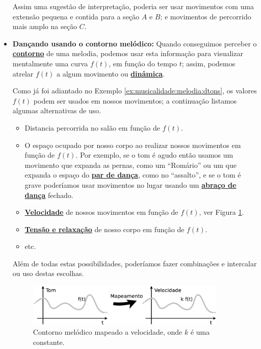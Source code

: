 \begin{itemize}
\begin{example}
Assim uma sugestão de interpretação, 
poderia ser usar movimentos com uma extensão pequena e contida para
a seção $A$ e $B$; e movimentos de percorrido mais amplo na seção $C$. 
\end{example}
\item \textbf{Dançando usando o contorno melódico:}
Quando conseguimos perceber o \hyperref[ref:melodica:shape]{\textbf{contorno}} de uma melodia,
podemos usar esta informação para visualizar mentalmente uma curva $f(t)$, em função do tempo $t$;
assim, podemos atrelar $f(t)$ a algum movimento ou \hyperref[sec:musicalidade:dinamicas]{\textbf{dinâmica}}.
\begin{example}
Como já foi adiantado no Exemplo \ref{ex:musicalidade:melodia:dtons},
 os valores $f(t)$ podem ser usados em nossos movimentos; 
a continuação listamos algumas alternativas de uso.
\begin{itemize}
\item Distancia percorrida no salão em função de $f(t)$.
\item O espaço ocupado por nosso corpo ao realizar nossos movimentos em função de $f(t)$.
Por exemplo, se o tom é agudo então usamos um movimento que expanda as pernas, como um ``Romário''
ou um que expanda o espaço do \hyperref[def:Par]{\textbf{par de dança}}, como no ``assalto'', 
e se o tom é grave poderíamos usar movimentos no lugar usando um 
\hyperref[def:abracodedanca]{\textbf{abraço de dança}} fechado. 
\item \hyperref[subsec:dinamica:velocidade]{\textbf{Velocidade}} de nossos movimentos 
em função de $f(t)$, ver Figura \ref{fig:mapeamento-melodica-ft}.
\item \hyperref[sec:musicalidadetensionrelease]{\textbf{Tensão e relaxação}} de nosso corpo em função de $f(t)$.
\item etc.
\end{itemize}
Além de todas estas possibilidades, poderíamos fazer combinações e intercalar ou uso  destas escolhas.
\end{example}
\begin{figure}[!h]
    \centering
    \includegraphics[width=0.9\textwidth]{chapters/cap-musicalidade-tecnica/ft.eps}
    \caption{Contorno melódico mapeado a velocidade, onde $k$ é uma constante.}
    \label{fig:mapeamento-melodica-ft}
\end{figure}


\end{itemize}
